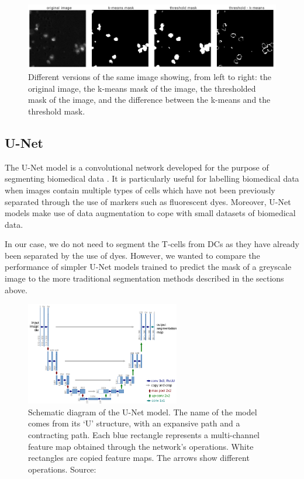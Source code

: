 \begin{figure}[h]
    \centering
    \includegraphics[width=\textwidth]{dissertation/figures/mask_difference.png}
    \caption{Different versions of the same image showing, from left to right: the original image, the k-means mask of the image, the thresholded mask of the image, and the difference between the k-means and the threshold mask.}
    \label{fig:maskdiff}
\end{figure}

\subsection{U-Net}

The U-Net model is a convolutional network developed for the purpose of segmenting biomedical data \citep{ronneberger_unet_2015}. It is particularly useful for labelling biomedical data when images contain multiple types of cells which have not been previously separated through the use of markers such as fluorescent dyes. Moreover, U-Net models make use of data augmentation to cope with small datasets of biomedical data.

In our case, we do not need to segment the T-cells from DCs as they have already been separated by the use of dyes. However, we wanted to compare the performance of simpler U-Net models trained to predict the mask of a greyscale image to the more traditional segmentation methods described in the sections above.

\begin{figure}[h!]
    \centering
    \includegraphics[width=0.6\textwidth]{dissertation/figures/unet_model.png}
    \caption{Schematic diagram of the U-Net model. The name of the model comes from its `U' structure, with an expansive path and a contracting path. Each blue rectangle represents a multi-channel feature map obtained through the network's operations. White rectangles are copied feature maps. The arrows show different operations. Source: \citet{ronneberger_unet_2015}}
    \label{fig:unet}
\end{figure}

